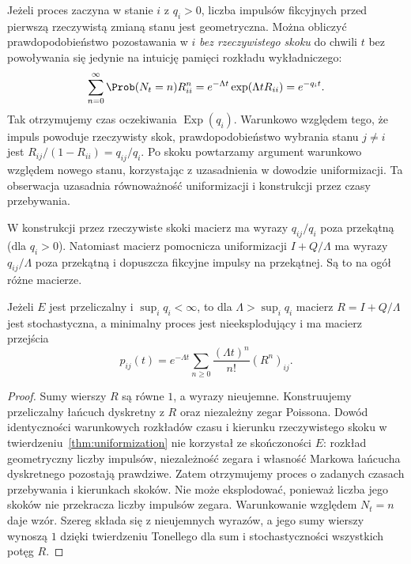\begin{uwaga}
Jeżeli proces zaczyna w stanie $i$ z $q_i>0$,
liczba impulsów fikcyjnych przed pierwszą rzeczywistą
zmianą stanu jest geometryczna. Można obliczyć
prawdopodobieństwo pozostawania w $i$ \emph{bez
rzeczywistego skoku} do chwili $t$ bez powoływania się
jedynie na intuicję pamięci rozkładu wykładniczego:
\[
\sum_{n=0}^\infty\Prob(N_t=n)R_{ii}^{n}
=e^{-\Lambda t}\exp(\Lambda tR_{ii})
=e^{-q_it}.
\]
Tak otrzymujemy czas oczekiwania $\operatorname{Exp}(q_i)$.
Warunkowo względem tego, że impuls powoduje rzeczywisty skok,
prawdopodobieństwo wybrania stanu $j\ne i$ jest
$R_{ij}/(1-R_{ii})=q_{ij}/q_i$.
Po skoku powtarzamy argument warunkowo względem
nowego stanu, korzystając z uzasadnienia w dowodzie
uniformizacji. Ta obserwacja uzasadnia
równoważność uniformizacji i konstrukcji przez czasy przebywania.
\end{uwaga}

\begin{uwaga}
W konstrukcji przez rzeczywiste skoki macierz ma
wyrazy $q_{ij}/q_i$ poza przekątną (dla $q_i>0$).
Natomiast macierz pomocnicza uniformizacji
$I+Q/\Lambda$ ma wyrazy $q_{ij}/\Lambda$ poza
przekątną i dopuszcza fikcyjne impulsy na przekątnej.
Są to na ogół różne macierze.
\end{uwaga}

\begin{wniosek}
Jeżeli $E$ jest przeliczalny i $\sup_i q_i<\infty$,
to dla $\Lambda>\sup_i q_i$ macierz $R=I+Q/\Lambda$
jest stochastyczna, a minimalny proces jest
nieeksplodujący i ma macierz przejścia
\[
p_{ij}(t)=e^{-\Lambda t}\sum_{n\ge0}
\frac{(\Lambda t)^n}{n!}(R^n)_{ij}.
\]
\end{wniosek}
\begin{proof}
Sumy wierszy $R$ są równe $1$, a wyrazy nieujemne.
Konstruujemy przeliczalny łańcuch dyskretny z $R$
oraz niezależny zegar Poissona. Dowód identyczności
warunkowych rozkładów czasu i kierunku rzeczywistego
skoku w twierdzeniu~\ref{thm:uniformization} nie
korzystał ze skończoności $E$: rozkład geometryczny
liczby impulsów, niezależność zegara i własność Markowa
łańcucha dyskretnego pozostają prawdziwe.
Zatem otrzymujemy proces o zadanych czasach przebywania
i kierunkach skoków. Nie może eksplodować, ponieważ
liczba jego skoków nie przekracza liczby impulsów
zegara. Warunkowanie względem $N_t=n$ daje wzór.
Szereg składa się z nieujemnych wyrazów, a jego
sumy wierszy wynoszą $1$ dzięki twierdzeniu Tonellego
dla sum i stochastyczności wszystkich potęg $R$.
\end{proof}

